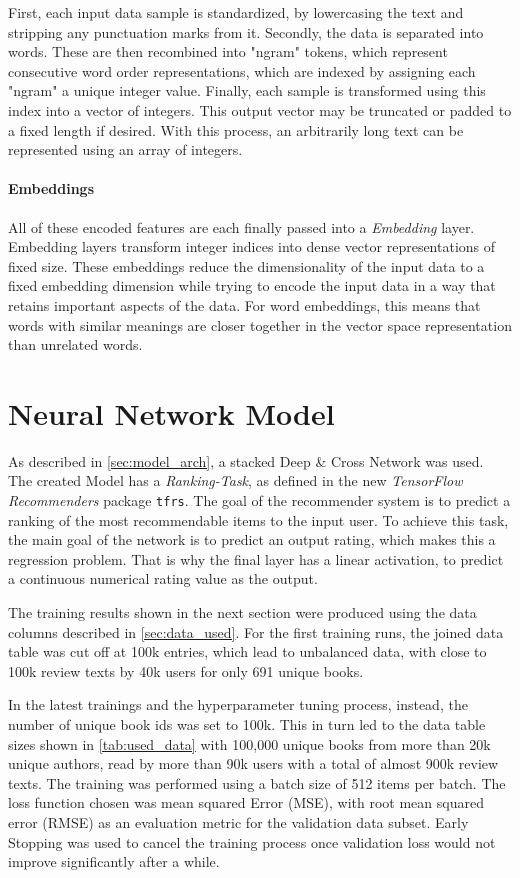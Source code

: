 \documentclass[10pt,final,journal,a4paper,oneside,twocolumn]{IEEEtran}
\begin{document}
First, each input data sample is standardized, by lowercasing the text and stripping any punctuation marks from it.
Secondly, the data is separated into words. These are then recombined into "ngram" tokens, which represent consecutive word order representations, which are indexed by assigning each "ngram" a unique integer value. Finally, each sample is transformed using this index into a vector of integers.
This output vector may be truncated or padded to a fixed length if desired.
With this process, an arbitrarily long text can be represented using an array of integers.

\paragraph{Embeddings}
All of these encoded features are each finally passed into a \emph{Embedding} layer. 
Embedding layers transform integer indices into dense vector representations of fixed size. These embeddings reduce the dimensionality of the input data to a fixed embedding dimension while trying to encode the input data in a way that retains important aspects of the data. For word embeddings, this means that words with similar meanings are closer together in the vector space representation than unrelated words.



\section{Neural Network Model}
As described in \autoref{sec:model_arch}, a stacked Deep \& Cross Network was used.
The created Model has a \emph{Ranking-Task}, as defined in the new \emph{TensorFlow Recommenders} package \texttt{tfrs}. The goal of the recommender system is to predict a ranking of the most recommendable items to the input user. To achieve this task, the main goal of the network is to predict an output rating, which makes this a regression problem. That is why the final layer has a linear activation, to predict a continuous numerical rating value as the output.

The training results shown in the next section were produced using the data columns described in \autoref{sec:data_used}. For the first training runs, the joined data table was cut off at 100k entries, which lead to unbalanced data, with close to 100k review texts by 40k users for only 691 unique books.

In the latest trainings and the hyperparameter tuning process, instead, the number of unique book ids was set to 100k. This in turn led to the data table sizes shown in \autoref{tab:used_data} with 100,000 unique books from more than 20k unique authors, read by more than 90k users with a total of almost 900k review texts. The training was performed using a batch size of 512 items per batch. The loss function chosen was mean squared Error (MSE), with root mean squared error (RMSE) as an evaluation metric for the validation data subset. Early Stopping was used to cancel the training process once validation loss would not improve significantly after a while.
\end{document}
